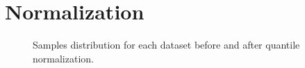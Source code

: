 \chapter{Normalization} \label{dist-quantiles}

\begin{figure}[h]%
    \centering
    \qquad
\caption{Samples distribution for each dataset before and after quantile normalization.}
\label{fig:norm-all}%
\end{figure}
